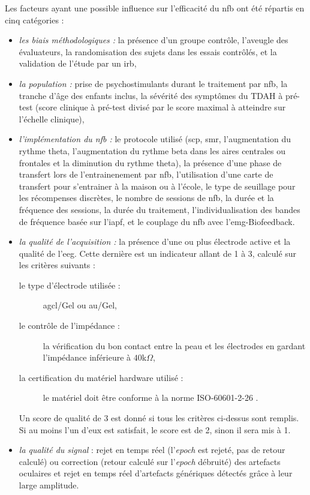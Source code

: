 Les facteurs ayant une possible influence sur l'efficacité du \gls{nfb} ont été répartis en cinq catégories :
\renewcommand{\labelitemi}{$\bullet$}
\begin{itemize}
\item \emph{les biais méthodologiques :} la présence d'un groupe contrôle, l'aveugle des évaluateurs, la randomisation des sujets dans les essais contrôlés, et la validation de l'étude 
par un \gls{irb},
\item \emph{la population :} prise de psychostimulants durant le traitement par \gls{nfb}, la tranche d'âge des enfants inclus, la sévérité des symptômes du TDAH à pré-test (score clinique à pré-test
divisé par le score maximal à atteindre sur l'échelle clinique),
\item \emph{l'implémentation du \gls{nfb} :} le protocole utilisé (\gls{scp}, \gls{smr}, l'augmentation du rythme theta, l'augmentation du rythme beta dans les aires centrales ou frontales 
et la diminution du rythme theta), la présence d'une phase de transfert lors de l'entrainenement par \gls{nfb}, l'utilisation d'une carte de transfert pour s'entrainer à la maison ou à l'école, 
le type de seuillage pour les récompenses discrètes, le nombre de sessions de \gls{nfb}, la durée et la fréquence des sessions, la durée du traitement, l'individualisation des bandes de fréquence
basée sur l'\gls{iapf}, et le couplage du \gls{nfb} avec l'\gls{emg}-Biofeedback.
\item \emph{la qualité de l'acquisition :} la présence d'une ou plus électrode active et la qualité de l'\gls{eeg}. Cette dernière est un indicateur allant de 1 à 3, calculé sur les critères 
suivants : 
\begin{description} 
\item[le type d'électrode utilisée :] \gls{agcl}/Gel ou \gls{au}/Gel,
\item[le contrôle de l'impédance :] la vérification du bon contact entre la peau et les électrodes en gardant l'impédance inférieure à $40$k$\Omega$,
\item[la certification du matériel hardware utilisé :] le matériel doit être conforme à la norme ISO-60601-2-26 \citep{ISO}.
\end{description}

Un score de qualité de 3 est donné si tous les critères ci-dessus sont remplis. Si au moins l'un d'eux est satisfait, le score est de 2, sinon il sera mis à 1.

\item \emph{la qualité du signal} : rejet en temps réel (l'\textit{epoch} est rejeté, pas de retour calculé) ou correction (retour calculé sur l'\textit{epoch} débruité) des 
artefacts oculaires et rejet en temps réel d'artefacts génériques détectés grâce à leur large amplitude. 
\end{itemize}

